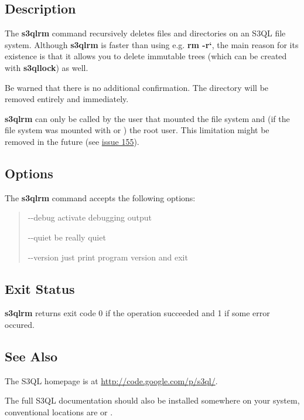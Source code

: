 \documentclass[letterpaper,10pt,english]{sphinxmanual}
\begin{document}
\subsection{Description}
\label{man/rm:description}
The \textbf{s3qlrm} command recursively deletes files and directories on an
S3QL file system. Although \textbf{s3qlrm} is faster than using e.g.
\textbf{rm -r{}`}, the main reason for its existence is that it allows
you to delete immutable trees (which can be created with
\textbf{s3qllock}) as well.

Be warned that there is no additional confirmation. The directory will
be removed entirely and immediately.

\textbf{s3qlrm} can only be called by the user that mounted the file system
and (if the file system was mounted with  or
) the root user. This limitation might be
removed in the future (see \href{http://code.google.com/p/s3ql/issues/detail?id=155}{issue 155}).


\subsection{Options}
\label{man/rm:options}
The \textbf{s3qlrm} command accepts the following options:
\begin{quote}
\begin{optionlist}{3cm}
\item [-{-}debug]  
activate debugging output
\item [-{-}quiet]  
be really quiet
\item [-{-}version]  
just print program version and exit
\end{optionlist}
\end{quote}


\subsection{Exit Status}
\label{man/rm:exit-status}
\textbf{s3qlrm} returns exit code 0 if the operation succeeded and 1 if some
error occured.


\subsection{See Also}
\label{man/rm:see-also}
The S3QL homepage is at \href{http://code.google.com/p/s3ql/}{http://code.google.com/p/s3ql/}.

The full S3QL documentation should also be installed somewhere on your
system, conventional locations are  or
.
\end{document}
